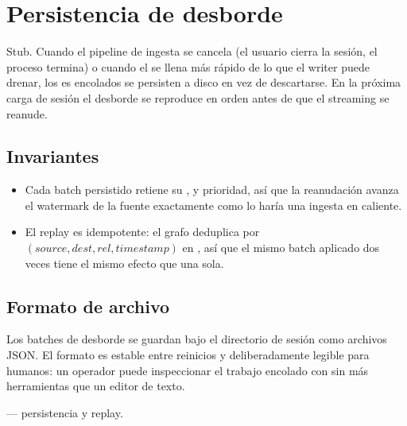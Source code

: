 \chapter{Persistencia de desborde}
\label{ch:overflow}

\begin{note}
Stub. Cuando el pipeline de ingesta se cancela (el usuario cierra
la sesión, el proceso termina) o cuando el 
se llena más rápido de lo que el writer puede drenar, los
es encolados se persisten a disco en vez de
descartarse. En la próxima carga de sesión el desborde se
reproduce en orden antes de que el streaming se reanude.
\end{note}

\section{Invariantes}

\begin{itemize}
    \item Cada batch persistido retiene su ,
         y prioridad, así que la reanudación
        avanza el watermark de la fuente exactamente como lo
        haría una ingesta en caliente.
    \item El replay es idempotente: el grafo deduplica por
        $(source, dest, rel, timestamp)$ en
        , así que el
        mismo batch aplicado dos veces tiene el mismo efecto que
        una sola.
\end{itemize}

\section{Formato de archivo}

Los batches de desborde se guardan bajo el directorio de sesión
como archivos JSON. El formato es estable entre reinicios y
deliberadamente legible para humanos: un operador puede
inspeccionar el trabajo encolado con  sin más herramientas
que un editor de texto.

\begin{inthecode}
 ---
persistencia y replay.
\end{inthecode}
